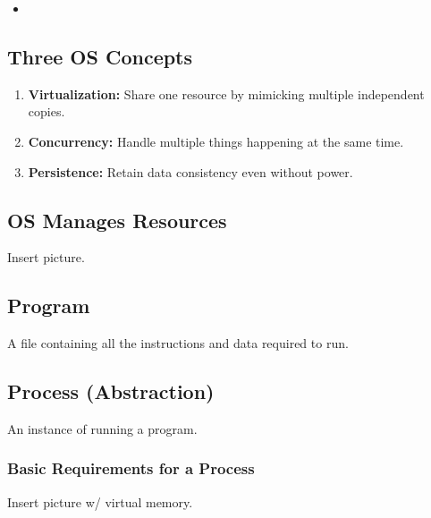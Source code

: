 \begin{summary}
    \begin{itemize}
        \item 
    \end{itemize}    
\end{summary}

\subsection{Three OS Concepts}
\begin{definition}
    \begin{enumerate}
        \item \textbf{Virtualization:} Share one resource by mimicking multiple independent copies.
        \item \textbf{Concurrency:} Handle multiple things happening at the same time.
        \item \textbf{Persistence:} Retain data consistency even without power. 
    \end{enumerate}
\end{definition}

\subsection{OS Manages Resources}
\begin{definition}
    Insert picture. 
\end{definition}

\subsection{Program}
\begin{definition}
    A file containing all the instructions and data required to run. 
\end{definition}

\subsection{Process (Abstraction)}
\begin{definition}
    An instance of running a program.
\end{definition}

\subsubsection{Basic Requirements for a Process}
\begin{definition}
    Insert picture w/ virtual memory. 
\end{definition}

